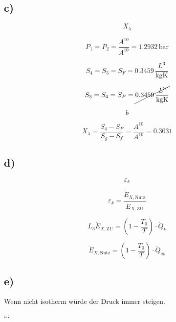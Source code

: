 \subsection*{c)}

\[
X_\lambda
\]

\[
P_1 = P_2 = \frac{A^{10}}{A^{10}} = 1.2932 \, \text{bar}
\]

\[
S_4 = S_3 = S_F = 0.3459 \, \frac{L^3}{\text{kgK}}
\]

\[
S_3 = S_4 = S_F = \cancel{0.3459 \, \frac{L^3}{\text{kgK}}}
\]

\[
b
\]

\[
X_\lambda = \frac{S_4 - S_P}{S_g - S_f} = \frac{A^{10}}{A^{10}} = 0.3031
\]

\subsection*{d)}

\[
\varepsilon_k
\]

\[
\varepsilon_k = \frac{\dot{E}_{X,\text{Nutz}}}{\dot{E}_{X,\text{ZU}}}
\]

\[
L_3 \dot{E}_{X,\text{ZU}} = \left(1 - \frac{T_0}{T}\right) \cdot \dot{Q}_k
\]

\[
\dot{E}_{X,\text{Nutz}} = \left(1 - \frac{T_0}{T}\right) \cdot \dot{Q}_{ab}
\]

\subsection*{e)}

Wenn nicht isotherm würde der Druck immer steigen.

```